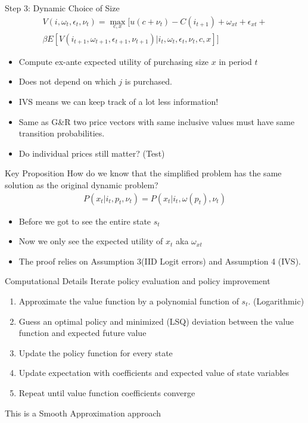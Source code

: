\begin{frame}{Step 3: Dynamic Choice of Size}
\begin{eqnarray*}
V(i,\omega_t,\epsilon_t,\nu_t) = \max_{c,x} [ u(c + \nu_t) - C(i_{t+1}) + \omega_{xt} + \epsilon_{xt} + \\
\beta E[V(i_{t+1},\omega_{t+1},\epsilon_{t+1},\nu_{t+1}) | i_t, \omega_t, \epsilon_t, \nu_t, c, x] ]
\end{eqnarray*}

\begin{itemize}
\item Compute ex-ante expected utility of purchasing size $x$ in period $t$
\item Does not depend on which $j$ is purchased.
\item IVS means we can keep track of a lot less information!
\item Same as G\&R two price vectors with same inclusive values must have same transition probabilities.
\item Do individual prices still matter? (Test)
\end{itemize}
\end{frame}

\begin{frame}{Key Proposition}
How do we know that the simplified problem has the same solution as the original dynamic problem?
\begin{eqnarray*}
P(x_t | i_t,p_t, \nu_t) = P(x_t | i_t, \omega(p_t),\nu_t)
\end{eqnarray*}

\begin{itemize}
\item Before we got to see the entire state $s_t$
\item Now we only see the expected utility of $x_t$ aka $\omega_{xt}$
\item The proof relies on Assumption 3(IID Logit errors) and Assumption 4 (IVS).
\end{itemize}
\end{frame}

\begin{frame}{Computational Details}
Iterate policy evaluation and policy improvement 
\begin{enumerate}
\item Approximate the value function by a polynomial function of $s_t$. (Logarithmic)
\item Guess an optimal policy and minimized (LSQ) deviation between the value function and expected future value
\item Update the policy function for every state
\item Update expectation with coefficients and expected value of state variables
\item Repeat until value function coefficients converge
\end{enumerate}
This is a \alert{Smooth Approximation} approach
\end{frame}



